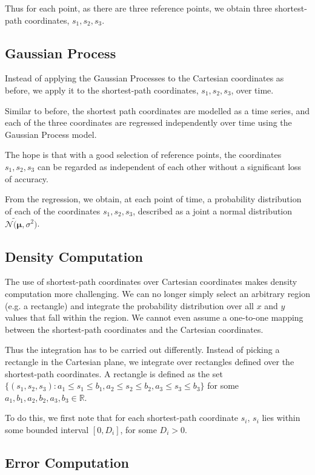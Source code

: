 \documentclass[letterpaper]{article}
\begin{document}
Thus for each point, as there are three reference points, we obtain three shortest-path coordinates, $s_1, s_2, s_3$.

\subsection{Gaussian Process}

Instead of applying the Gaussian Processes to the Cartesian coordinates as before, we apply it to the shortest-path coordinates, $s_1, s_2, s_3$, over time.

Similar to before, the shortest path coordinates are modelled as a time series, and each of the three coordinates are regressed independently over time using the Gaussian Process model.

The hope is that with a good selection of reference points, the coordinates $s_1, s_2, s_3$ can be regarded as independent of each other without a significant loss of accuracy.

From the regression, we obtain, at each point of time, a probability distribution of each of the coordinates $s_1, s_2, s_3$, described as a joint a normal distribution $\mathcal{N}\tilde (\boldsymbol{\mu},\sigma^2)$.

\subsection{Density Computation}

The use of shortest-path coordinates over Cartesian coordinates makes density computation more challenging. We can no longer simply select an arbitrary region (e.g. a rectangle) and integrate the probability distribution over all $x$ and $y$ values that fall within the region. We cannot even assume a one-to-one mapping between the shortest-path coordinates and the Cartesian coordinates.

Thus the integration has to be carried out differently. Instead of picking a rectangle in the Cartesian plane, we integrate over rectangles defined over the shortest-path coordinates. A rectangle is defined as the set $\{(s_1,s_2,s_3) : a_1\leq s_1\leq b_1, a_2\leq s_2\leq b_2, a_3\leq s_3\leq b_3\}$ for some $a_1,b_1,a_2,b_2,a_3,b_3 \in \mathbb{R}$.

To do this, we first note that for each shortest-path coordinate $s_i$, $s_i$ lies within some bounded interval $[0,D_i]$, for some $D_i > 0$.



\subsection{Error Computation}
\end{document}
